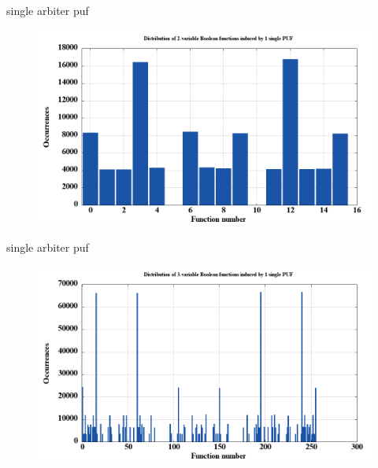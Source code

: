 \documentclass[10pt, compress]{beamer}
\begin{document}
\begin{frame}{single arbiter puf}
    \begin{figure}
        \centering
        \includegraphics[width=\textwidth]{figures/dist/distribution_of_2-variable_boolean_functions_induced_by_1_single_puf.png}
    \end{figure}
\end{frame}

\begin{frame}{single arbiter puf}
    \begin{figure}
        \centering
        \includegraphics[width=\textwidth]{figures/dist/distribution_of_3-variable_boolean_functions_induced_by_1_single_puf.png}
    \end{figure}
\end{frame}
\end{document}
